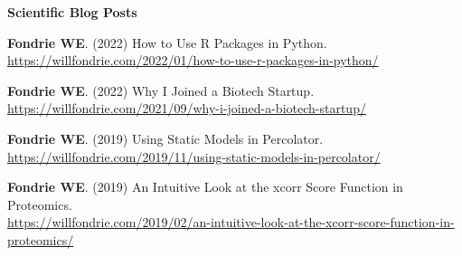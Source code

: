 \documentclass[11pt]{article}
\newcommand{\mysection}[1]{\vspace{1ex} \textbf{\large \textsf{#1} \quad \hrulefill}}
\newcommand{\myref}[1]{\href{#1}{\url{#1}}}
\begin{document}
\mysection{Scientific Blog Posts}
\begin{etaremune}
  \item \textbf{Fondrie WE}. (2022) How to Use R Packages in Python. \\
  \myref{https://willfondrie.com/2022/01/how-to-use-r-packages-in-python/}

  \item \textbf{Fondrie WE}. (2022) Why I Joined a Biotech Startup. \\
  \myref{https://willfondrie.com/2021/09/why-i-joined-a-biotech-startup/}

  \item \textbf{Fondrie WE}. (2019) Using Static Models in Percolator. \\
  \myref{https://willfondrie.com/2019/11/using-static-models-in-percolator/}

  \item \textbf{Fondrie WE}. (2019) An Intuitive Look at the xcorr Score
  Function in Proteomics. \\
  \myref{https://willfondrie.com/2019/02/an-intuitive-look-at-the-xcorr-score-function-in-proteomics/}

\end{etaremune}








\end{document}
